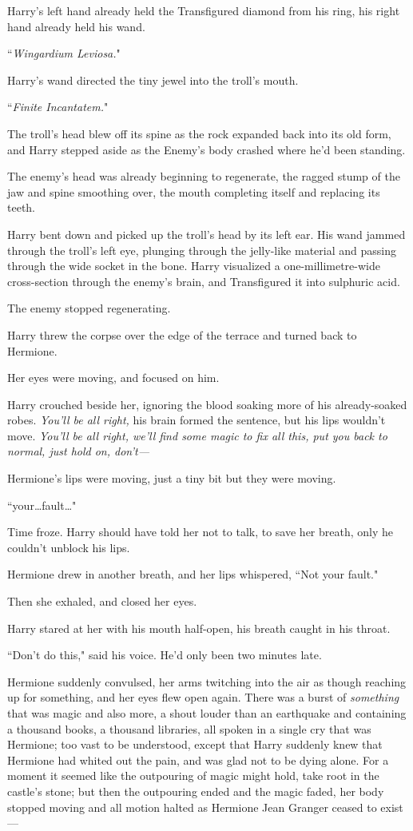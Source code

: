 Harry's left hand already held the Transfigured diamond from his ring, his right hand already held his wand.

``\emph{Wingardium Leviosa.}"

Harry's wand directed the tiny jewel into the troll's mouth.

``\emph{Finite Incantatem.}"

The troll's head blew off its spine as the rock expanded back into its old form, and Harry stepped aside as the Enemy's body crashed where he'd been standing.

The enemy's head was already beginning to regenerate, the ragged stump of the jaw and spine smoothing over, the mouth completing itself and replacing its teeth.

Harry bent down and picked up the troll's head by its left ear. His wand jammed through the troll's left eye, plunging through the jelly-like material and passing through the wide socket in the bone. Harry visualized a one-millimetre-wide cross-section through the enemy's brain, and Transfigured it into sulphuric acid.

The enemy stopped regenerating.

Harry threw the corpse over the edge of the terrace and turned back to Hermione.

Her eyes were moving, and focused on him.

Harry crouched beside her, ignoring the blood soaking more of his already-soaked robes. \emph{You'll be all right,} his brain formed the sentence, but his lips wouldn't move. \emph{You'll be all right, we'll find some magic to fix all this, put you back to normal, just hold on, don't—}

Hermione's lips were moving, just a tiny bit but they were moving.

``your…fault…"

Time froze. Harry should have told her not to talk, to save her breath, only he couldn't unblock his lips.

Hermione drew in another breath, and her lips whispered, ``Not your fault."

Then she exhaled, and closed her eyes.

Harry stared at her with his mouth half-open, his breath caught in his throat.

``Don't do this," said his voice. He'd only been two minutes late.

Hermione suddenly convulsed, her arms twitching into the air as though reaching up for something, and her eyes flew open again. There was a burst of \emph{something} that was magic and also more, a shout louder than an earthquake and containing a thousand books, a thousand libraries, all spoken in a single cry that was Hermione; too vast to be understood, except that Harry suddenly knew that Hermione had whited out the pain, and was glad not to be dying alone. For a moment it seemed like the outpouring of magic might hold, take root in the castle's stone; but then the outpouring ended and the magic faded, her body stopped moving and all motion halted as Hermione Jean Granger ceased to exist—

